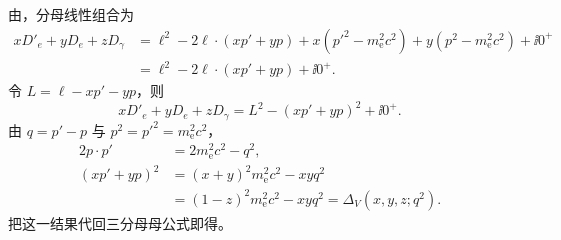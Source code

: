 \begin{derivation}
由，分母线性组合为
\begin{align*}
xD'_e+yD_e+zD_\gamma
&=\ell^2-2\ell\cdot(xp'+yp)
+x(p'^2-m_{\mathrm e}^2c^2)+y(p^2-m_{\mathrm e}^2c^2)+\ii0^+\\
&=\ell^2-2\ell\cdot(xp'+yp)+\ii0^+.
\end{align*}
令 $L=\ell-xp'-yp$，则
\begin{equation*}
xD'_e+yD_e+zD_\gamma
=L^2-(xp'+yp)^2+\ii0^+.
\end{equation*}
由 $q=p'-p$ 与 $p^2=p'^2=m_{\mathrm e}^2c^2$，
\begin{align*}
2p\!\cdot p'&=2m_{\mathrm e}^2c^2-q^2,\\
(xp'+yp)^2
&=(x+y)^2m_{\mathrm e}^2c^2-xyq^2\\
&=(1-z)^2m_{\mathrm e}^2c^2-xyq^2
=\Delta_V(x,y,z;q^2).
\end{align*}
把这一结果代回三分母母公式即得。
\end{derivation}


